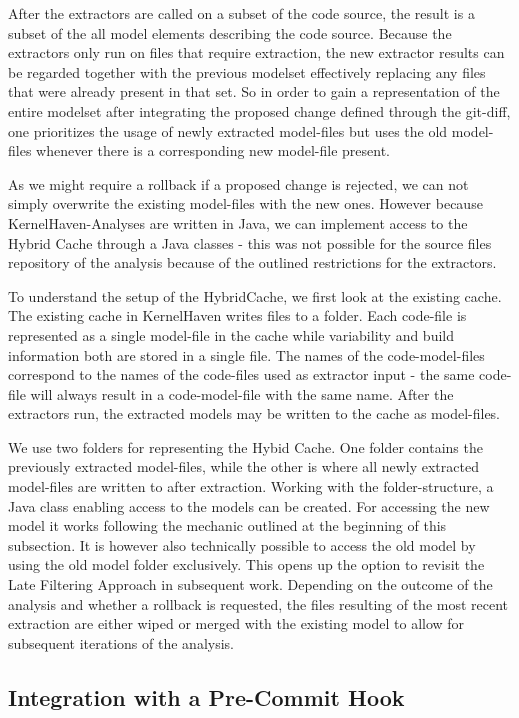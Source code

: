 \documentclass[a4paper]{article}
\begin{document}
After the extractors are called on a subset of the code source, the result is a subset of the all model elements describing the code source. Because the extractors only run on files that require extraction, the new extractor results can be regarded together with the previous modelset effectively replacing any files that were already present in that set. So in order to gain a representation of the entire modelset after integrating the proposed change defined through the git-diff, one prioritizes the usage of newly extracted model-files but uses the old model-files whenever there is a corresponding new model-file present.

As we might require a rollback if a proposed change is rejected, we can not simply overwrite the existing model-files with the new ones. However because KernelHaven-Analyses are written in Java, we can implement access to the Hybrid Cache through a Java classes - this was not possible for the source files repository of the analysis because of the outlined restrictions for the extractors.

To understand the setup of the HybridCache, we first look at the existing cache. The existing cache in KernelHaven writes files to a folder. Each code-file is represented as a single model-file in the cache while variability and build information both are stored in a single file. The names of the code-model-files correspond to the names of the code-files used as extractor input - the same code-file will always result in a code-model-file with the same name. After the extractors run, the extracted models may be written to the cache as model-files.

We use two folders for representing the Hybid Cache. One folder contains the previously extracted model-files, while the other is where all newly extracted model-files are written to after extraction. Working with the folder-structure, a Java class enabling access to the models can be created. For accessing the new model it works following the mechanic outlined at the beginning of this subsection. It is however also technically possible to access the old model by using the old model folder exclusively. This opens up the option to revisit the Late Filtering Approach in subsequent work. Depending on the outcome of the analysis and whether a rollback is requested, the files resulting of the most recent extraction are either wiped or merged with the existing model to allow for subsequent iterations of the analysis.

\subsection{Integration with a Pre-Commit Hook}
\end{document}

